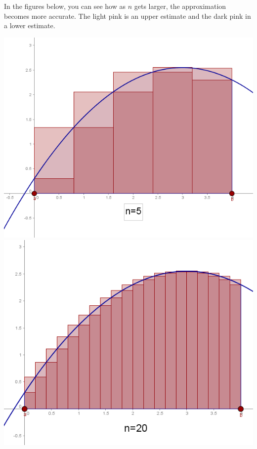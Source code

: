 \documentclass[nooutcomes,handout]{ximera}
\begin{document}
\begin{problem}
\begin{enumerate}
\begin{freeResponse}
      In the figures below, you can see how as $n$ gets larger, the approximation becomes more accurate.  The light pink is an upper estimate and the dark pink in a lower estimate.
      
      
      \begin{image}
      \includegraphics[scale=.4]{figure1.png}
      \includegraphics[scale=.4]{figure2.png}

\end{image}
\end{freeResponse}
\end{enumerate}
\end{problem}
\end{document}
